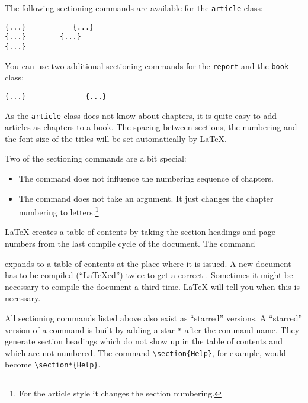 The following sectioning commands are available for the
\texttt{article} class: \nopagebreak
\begin{code}
\verb|{...}           |\verb|{...}|\\
\verb|{...}        |\verb|{...} |\\
\verb|{...}     |
\end{code}

You can use two additional sectioning commands for the \texttt{report}
and the \texttt{book} class:
\begin{code}
\verb|{...}              |\verb|{...}|
\end{code}

As the \texttt{article} class does not know about chapters, it is quite easy
to add articles as chapters to a book.
The spacing between sections, the numbering and the font size of the
titles will be set automatically by \LaTeX. 

\pagebreak[3]
Two of the sectioning commands are a bit special: 
\begin{itemize}
\item The  command does
  not influence the numbering sequence of chapters.  
\item The  command does not take an argument. It just
  changes the chapter numbering to letters.\footnote{For the article
    style it changes the section numbering.}
\end{itemize}



\LaTeX{} creates a table of contents by taking the section headings
and page numbers from the last compile cycle of the document. The command 
\begin{command} 
\end{command} 
\noindent expands to a table of contents at the place where it
is issued. A new
document has to be compiled (``\LaTeX ed'') twice to get a
correct . Sometimes it might be
necessary to compile the document a third time. \LaTeX{} will tell you
when this is necessary.

All sectioning commands listed above also exist as ``starred''
versions.  A ``starred'' version of a command is built by adding a
star \verb|*| after the command name.  They generate section headings
which do not show up in the table of contents and which are not
numbered. The command \verb|\section{Help}|, for example, would become
\verb|\section*{Help}|.

